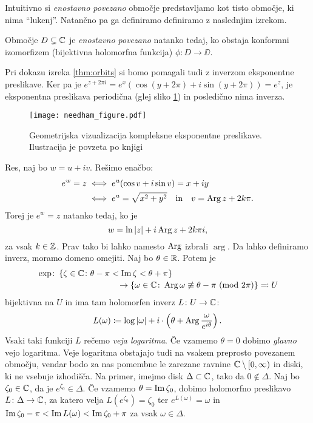 \noindent Intuitivno si \emph{enostavno povezano} območje predstavljamo kot tisto območje, ki nima ``lukenj''. Natančno pa ga definiramo definiramo z naslednjim izrekom.

\begin{definicija}
    Območje \(D \subsetneq \mathbb C\) je \emph{enostavno povezano} natanko tedaj, ko obstaja konformni izomorfizem (bijektivna holomorfna funkcija) \(\phi \colon D \to \DD\).
\end{definicija}

\vspace{0.5cm}
\noindent Pri dokazu izreka \ref{thm:orbits} si bomo pomagali tudi z inverzom eksponentne preslikave. Ker pa je \(e^{z + 2 \pi i} = e^x (\cos (y + 2 \pi) + i \sin (y + 2 \pi)) = e^z\), je eksponentna preslikava periodična (glej sliko \ref{fig:exponential}) in posledično nima inverza.
\begin{figure}
    \centering
    \texttt{[image: needham\_figure.pdf]}
    \caption[Geometrijsko delovanje kompleksne eksponentne preslikave]{Geometrijska vizualizacija kompleksne eksponentne preslikave. Ilustracija je povzeta po knjigi \cite{Needham_1997}}
    \label{fig:exponential}
\end{figure}
Res, naj bo \(w = u + i v\). Rešimo enačbo:
\begin{align*}
    e^w = z &\iff e^u (\cos v + i \sin v) = x + i y\\
            &\iff e^u = \sqrt{x^2 + y^2} \quad \text{in} \quad v = \operatorname{Arg} z + 2 k \pi.
\end{align*}
Torej je \(e^w = z\) natanko tedaj, ko je
\[w = \ln |z| + i \operatorname{Arg} z + 2 k \pi i,\]
za vsak \(k \in \mathbb Z\). Prav tako bi lahko namesto \(\operatorname{Arg}\) izbrali \(\arg\). Da lahko definiramo inverz, moramo domeno omejiti. Naj bo \(\theta \in \mathbb R\). Potem je
\[\begin{multlined}[10cm]
    \exp \colon  \set{\zeta \in \CC \colon \theta -\pi < \im \zeta < \theta + \pi}\\
    \to \set{\omega \in \CC \colon \Arg \omega \not\equiv \theta - \pi\ (\operatorname{mod}\, 2 \pi)} \eqcolon U
\end{multlined}\]
bijektivna na \(U\) in ima tam holomorfen inverz \(L \colon U \to \mathbb C\):
\[L (\omega) \coloneq \log |\omega| + i \cdot \left( \theta + \operatorname{Arg} \frac{\omega}{e^{i \theta}} \right).\]
Vsaki taki funkciji \(L\) rečemo \emph{veja logaritma}. Če vzamemo \(\theta = 0\) dobimo \emph{glavno} vejo logaritma. Veje logaritma obstajajo tudi na vsakem preprosto povezanem območju, vendar bodo za nas pomembne le zarezane ravnine \(\mathbb C \setminus [0, \infty)\) in diski, ki ne vsebuje izhodišča. Na primer, imejmo disk \(\Delta \subset \mathbb C\), tako da \(0 \notin \Delta\). Naj bo \(\zeta_0 \in \mathbb C\), da je \(e^{\zeta_0} \in \Delta\). Če vzamemo \(\theta = \operatorname{Im} \zeta_0\), dobimo holomorfno preslikavo \(L \colon \Delta \to \mathbb C\), za katero velja \(L (e^{\zeta_0}) = \zeta_0\) ter \(e^{L (\omega)} = \omega\) in \(\operatorname{Im} \zeta_0 - \pi < \operatorname{Im} L (\omega) < \operatorname{Im} \zeta_0 + \pi\) za vsak \(\omega \in \Delta\).

